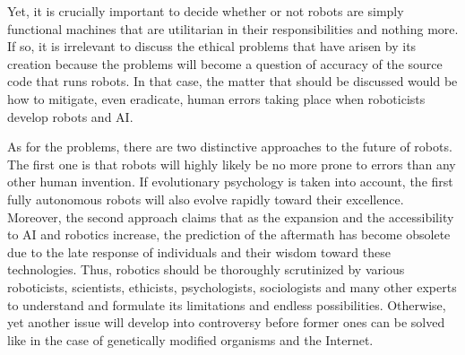 \documentclass[man]{apa6}
\begin{document}
Yet, it is crucially important to decide whether or not robots are simply functional machines that are utilitarian in their responsibilities and nothing more.
If so, it is irrelevant to discuss the ethical problems that have arisen by its creation because the problems will become a question of accuracy of the source code that runs robots.
In that case, the matter that should be discussed would be how to mitigate, even eradicate, human errors taking place when roboticists develop robots and AI. \par
As for the problems, there are two distinctive approaches to the future of robots. The first one is that robots will highly likely be no more prone to errors than any other human invention.
If evolutionary psychology is taken into account, the first fully autonomous robots will also evolve rapidly toward their excellence.
Moreover, the second approach claims that as the expansion and the accessibility to AI and robotics increase, the prediction of the aftermath has become obsolete due to the late response of individuals and their wisdom toward these technologies.
Thus, robotics should be thoroughly scrutinized by various roboticists, scientists, ethicists, psychologists, sociologists and many other experts to understand and formulate its limitations and endless possibilities. Otherwise, yet another issue will develop into controversy before former ones can be solved like in the case of genetically modified organisms and the Internet.  


\end{document}
